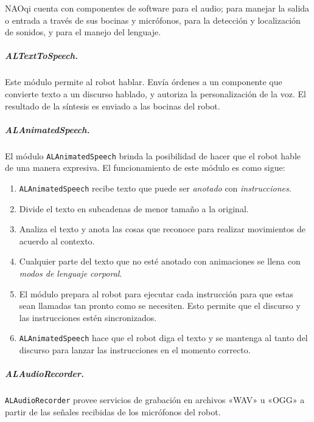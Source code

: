 NAOqi cuenta con componentes de software para el audio; para
manejar la salida o entrada a través de sus bocinas y micrófonos,
para la detección y localización de sonidos,  y para el manejo del lenguaje.


\subparagraph{ALTextToSpeech.}
\label{\detokenize{chapter_one/naoqi:altexttospeech}}
Este módulo permite al robot hablar. Envía órdenes a un componente que
convierte texto a un discurso hablado, y autoriza la personalización de la voz.
El resultado de la síntesis es enviado a las bocinas del robot.


\subparagraph{ALAnimatedSpeech.}
\label{\detokenize{chapter_one/naoqi:alanimatedspeech}}
El módulo \texttt{ALAnimatedSpeech} brinda la posibilidad de hacer que el robot hable
de una manera expresiva. El funcionamiento de este módulo es como sigue:
\begin{enumerate}
\item {} 
\texttt{ALAnimatedSpeech} recibe texto que puede ser \textit{anotado} con \textit{instrucciones}.

\item {} 
Divide el texto en subcadenas de menor tamaño a la original.

\item {} 
Analiza el texto y anota las cosas que reconoce para realizar movimientos de acuerdo al contexto.

\item {} 
Cualquier parte del texto que no esté anotado con animaciones se llena con \textit{modos de lenguaje corporal}.

\item {} 
El módulo prepara al robot para ejecutar cada instrucción para que estas sean llamadas tan pronto como se necesiten. Esto permite que el discurso y las instrucciones estén sincronizados.

\item {} 
\texttt{ALAnimatedSpeech} hace que el robot diga el texto y se mantenga al tanto del discurso para lanzar las instrucciones en el momento correcto.

\end{enumerate}


\subparagraph{ALAudioRecorder.}
\label{\detokenize{chapter_one/naoqi:alaudiorecorder}}
\texttt{ALAudioRecorder} provee servicios de grabación en archivos «WAV»
u «OGG» a partir de las señales recibidas de los micrófonos del robot.

